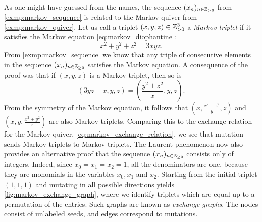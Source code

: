 \begin{example}

	As one might have guessed from the names, the sequence $(x_n)_{n \in \mathbb{Z}_{>0}}$ from
	\cref{exmp:markov_sequence} is related to the Markov quiver from
	\cref{exmp:markov_quiver}. Let us call a triplet $(x,y,z) \in
		\mathbb{Z}_{> 0}^3$ a \emph{Markov triplet} if it satisfies the Markov
	equation \cref{eq:markov_diophantine}:
	\begin{equation*}
		x^2 + y^2 + z^2 = 3 x y z.
	\end{equation*}
	From \cref{exmp:markov_sequence} we know that any triple of consecutive elements in the
	sequence $(x_n)_{n \in \mathbb{Z}_{\geq 0}}$ satisfies the Markov equation. A consequence of
	the proof was that if $(x,y,z)$ is a Markov triplet, then so is
	\begin{equation*}
		(3 yz -x, y, z) = (\frac{y^2 + z^2}{x}, y, z).
	\end{equation*}
	From the symmetry of the Markov equation, it follows that $(x, \frac{x^2 + z^2}{y}, z)$
	and $(x, y, \frac{x^2 + y^2}{z})$ are also Markov triplets. Comparing this to the
	exchange relation for the Markov quiver, \cref{eq:markov_exchange_relation}, we see
	that mutation sends Markov triplets to Markov triplets. The Laurent phenomenon now also
	provides an alternative proof that the sequence $(x_n)_{n\in \mathbb{Z}_{\geq 0}}$ consists
	only of integers. Indeed, since $x_0 = x_1 = x_2 = 1$, all the denominators are one,
	because they are monomials in the variables $x_0, x_1$ and $x_2$. Starting from the
	initial triplet $(1,1,1)$ and mutating in all possible directions yields
	\cref{fig:markov_exchange_graph}, where we identify triplets which are equal up to a
	permutation of the entries. Such graphs are known as \emph{exchange
		graphs}. The nodes consist of unlabeled seeds, and edges
	correspond to mutations.


\end{example}
